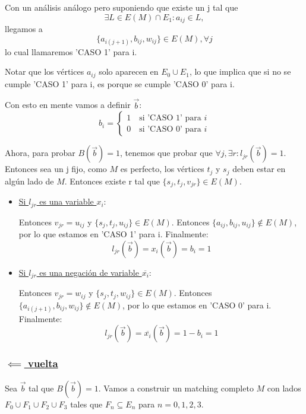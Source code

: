 \documentclass[11pt, a4paper]{article}
\theoremstyle{definition}
\begin{document}
Con un análisis análogo pero suponiendo que existe un j tal que
      \[\exists L \in E(M) \cap E_1 : a_{ij} \in L, \]
llegamos a 
      \[ \{a_{i(j+1)}, b_{ij}, w_{ij}\} \in E(M), \forall j \]
lo cual llamaremos 'CASO 1' para i.

Notar que los vértices \(a_{ij}\) solo aparecen en \(E_0 \cup E_1\), lo que implica que si no se cumple 'CASO 1' para i, es porque se cumple 'CASO 0' para i.

Con esto en mente vamos a definir \(\overrightarrow{b}\):
\[
b_i = \begin{cases}
	1  \quad\text{si 'CASO 1' para } i \\
	0  \quad\text{si 'CASO 0' para } i
\end{cases}
\]

Ahora, para probar \(B(\overrightarrow{b}) = 1\), tenemos que probar que \(\forall j, \exists r : l_{jr}(\overrightarrow{b}) = 1\). Entonces sea un j fijo, como \(M\) es perfecto, los vértices \(t_j\) y \(s_j\) deben estar en algún lado de \(M\). Entonces existe r tal que \(\{s_j, t_j, v_{jr}\} \in E(M)\).

\begin{itemize}
\item \uline{Si \(l_{jr}\) es una variable \(x_i\)}:

Entonces \(v_{jr} = u_{ij}\) y \(\{s_j, t_j, u_{ij}\} \in E(M)\). Entonces \(\{a_{ij}, b_{ij}, u_{ij}\} \not\in E(M)\), por lo que estamos en 'CASO 1' para i. Finalmente:
      \[ l_{jr}(\overrightarrow{b}) = x_i(\overrightarrow{b}) = b_i = 1 \]

\item \uline{Si \(l_{jr}\) es una negación de variable \(\overline{x_i}\)}:

Entonces \(v_{jr} = w_{ij}\) y \(\{s_j, t_j, w_{ij}\} \in E(M)\). Entonces \(\{a_{i(j+1)}, b_{ij}, w_{ij}\} \not\in E(M)\), por lo que estamos en 'CASO 0' para i. Finalmente:
      \[ l_{jr}(\overrightarrow{b}) = \overline{x_i}(\overrightarrow{b}) = 1 - b_i = 1 \]
\end{itemize}

\subsubsection*{\underline{\(\impliedby\) vuelta}}
Sea \(\overrightarrow{b}\) tal que \(B(\overrightarrow{b}) = 1\). Vamos a construir un matching completo \(M\) con lados \(F_0 \cup F_1 \cup F_2 \cup F_3\) tales que \(F_n \subseteq E_n\) para \(n = 0, 1, 2, 3\).
\end{document}
